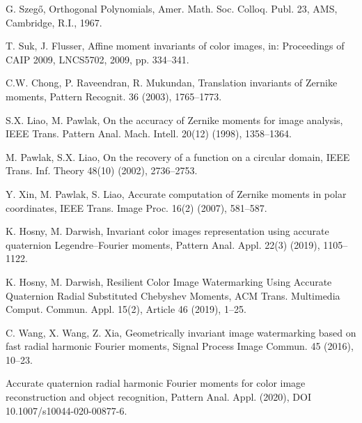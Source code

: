 \documentclass[12pt]{article}
\begin{document}
\begin{thebibliography}{99}
G. Szeg\H o, Orthogonal Polynomials, Amer. Math. Soc. Colloq. Publ. 23, AMS, Cambridge, R.I., 1967.

T. Suk, J. Flusser, Affine moment invariants of color images, in: Proceedings of CAIP 2009, LNCS5702, 2009, pp. 334--341.

C.W. Chong, P. Raveendran, R. Mukundan, Translation invariants of Zernike moments, Pattern Recognit. 36 (2003), 1765--1773.

S.X. Liao, M. Pawlak, On the accuracy of Zernike moments for image analysis, IEEE Trans. Pattern Anal. Mach. Intell. 20(12) (1998), 1358--1364.

M. Pawlak, S.X. Liao, On the recovery of a function on a circular domain, IEEE Trans. Inf. Theory 48(10) (2002), 2736–2753.

Y. Xin, M. Pawlak, S. Liao, Accurate computation of Zernike moments in polar coordinates, IEEE Trans. Image Proc. 16(2) (2007), 581--587.

K. Hosny, M. Darwish, 
Invariant color images representation using accurate quaternion Legendre--Fourier moments, 
Pattern Anal. Appl. 22(3) (2019), 1105--1122.

K. Hosny, M. Darwish, 
Resilient Color Image Watermarking Using Accurate Quaternion Radial Substituted Chebyshev Moments,
ACM Trans. Multimedia Comput. Commun. Appl. 15(2), Article 46 (2019), 1--25.

C. Wang, X. Wang, Z. Xia, Geometrically invariant image watermarking based on fast radial harmonic Fourier moments, 
Signal Process Image Commun. 45 (2016), 10--23.


Accurate quaternion radial harmonic Fourier moments for color image reconstruction and object recognition,
Pattern Anal. Appl. (2020), DOI 10.1007/s10044-020-00877-6.


\end{thebibliography}
\end{document}

